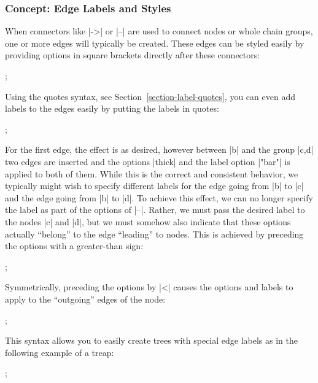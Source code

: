 \subsubsection{Concept: Edge Labels and Styles}

When connectors like |->| or |--| are used to connect nodes or whole chain
groups, one or more edges will typically be created. These edges can be styled
easily by providing options in square brackets directly after these connectors:
%
\begin{codeexample}[preamble={\usetikzlibrary{graphs}}]
\tikz {};
\end{codeexample}

Using the quotes syntax, see Section~\ref{section-label-quotes}, you can even
add labels to the edges easily by putting the labels in quotes:
%
\begin{codeexample}[preamble={\usetikzlibrary{graphs,quotes}}]
\tikz {};
\end{codeexample}

For the first edge, the effect is as desired, however between |b| and the group
|{c,d}| two edges are inserted and the options |thick| and the label option
|"bar"| is applied to both of them. While this is the correct and consistent
behavior, we typically might wish to specify different labels for the edge
going from |b| to |c| and the edge going from |b| to |d|. To achieve this
effect, we can no longer specify the label as part of the options of |--|.
Rather, we must pass the desired label to the nodes |c| and |d|, but we must
somehow also indicate that these options actually ``belong'' to the edge
``leading'' to nodes. This is achieved by preceding the options with a
greater-than sign:
%
\begin{codeexample}[preamble={\usetikzlibrary{graphs,quotes}}]
\tikz {};
\end{codeexample}

Symmetrically, preceding the options by |<| causes the options and labels to
apply to the ``outgoing'' edges of the node:
%
\begin{codeexample}[preamble={\usetikzlibrary{graphs,quotes}}]
\tikz {};
\end{codeexample}

This syntax allows you to easily create trees with special edge labels as in
the following example of a treap:
%
\begin{codeexample}[preamble={\usetikzlibrary{graphs,quotes}}]
\tikz
  ;
\end{codeexample}


